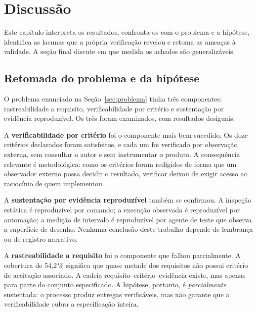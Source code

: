 
\chapter{Discussão}
\label{cap:discussao}

Este capítulo interpreta os resultados, confronta-os com o problema e a
hipótese, identifica as lacunas que a própria verificação revelou e retoma as
ameaças à validade. A seção final discute em que medida os achados são
generalizáveis.

\section{Retomada do problema e da hipótese}
\label{sec:disc-problema}

O problema enunciado na Seção~\ref{sec:problema} tinha três componentes:
rastreabilidade a requisito, verificabilidade por critério e sustentação por
evidência reproduzível. Os três foram examinados, com resultados desiguais.

A \textbf{verificabilidade por critério} foi o componente mais bem-sucedido. Os
doze critérios declarados foram satisfeitos, e cada um foi verificado por
observação externa, sem consultar o autor e sem instrumentar o produto. A
consequência relevante é metodológica: como os critérios foram redigidos de forma
que um observador externo possa decidir o resultado, verificar deixou de exigir
acesso ao raciocínio de quem implementou.

A \textbf{sustentação por evidência reproduzível} também se confirmou. A
inspeção estática é reproduzível por comando; a execução observada é reproduzível
por automação; a medição de intervalo é reproduzível por agente de teste que
observa a superfície de desenho. Nenhuma conclusão deste trabalho depende de
lembrança ou de registro narrativo.

A \textbf{rastreabilidade a requisito} foi o componente que falhou parcialmente.
A cobertura de 54,2\,\% significa que quase metade dos requisitos não possui
critério de aceitação associado. A cadeia requisito--critério--evidência existe,
mas apenas para parte do conjunto especificado. A hipótese, portanto, é
\emph{parcialmente} sustentada: o processo produz entregas verificáveis, mas não
garante que a verificabilidade cubra a especificação inteira.

